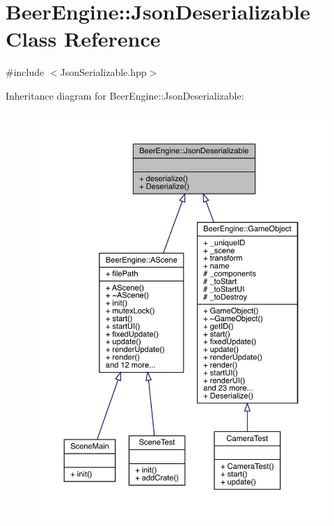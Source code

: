 \hypertarget{class_beer_engine_1_1_json_deserializable}{}\section{Beer\+Engine\+:\+:Json\+Deserializable Class Reference}
\label{class_beer_engine_1_1_json_deserializable}


{\ttfamily \#include $<$Json\+Serializable.\+hpp$>$}



Inheritance diagram for Beer\+Engine\+:\+:Json\+Deserializable\+:
\nopagebreak
\begin{figure}[H]
\begin{center}
\leavevmode
\includegraphics[width=350pt]{class_beer_engine_1_1_json_deserializable__inherit__graph}
\end{center}
\end{figure}


